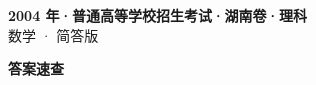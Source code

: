\documentclass[zihao=-4, a4paper]{ctexart}
\begin{document}
\begin{center}
  {\Large\bfseries 2004 年·普通高等学校招生考试·湖南卷·理科}\\[4pt]
  {\large 数学 · 简答版}
\end{center}
\medskip
{}

\clearpage
{}
\begin{center}{\Large\bfseries 答案速查}\end{center}
\medskip

\end{document}
